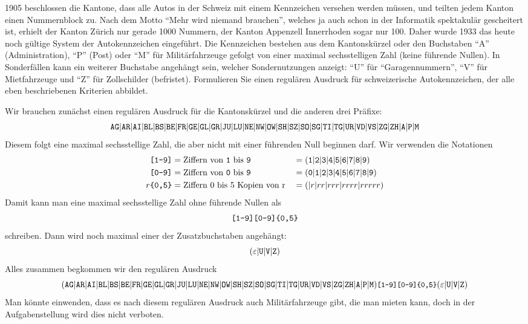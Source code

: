 1905 beschlossen die Kantone, dass alle Autos in der Schweiz mit einem
Kennzeichen versehen werden müssen, und teilten jedem Kanton einen
Nummernblock zu. Nach dem Motto ``Mehr wird niemand brauchen'', welches
ja auch schon in der Informatik spektakulär gescheitert ist, erhielt
der Kanton Zürich nur gerade 1000 Nummern, der
Kanton Appenzell Innerrhoden sogar nur 100.
Daher wurde 1933 das heute noch gültige System der Autokennzeichen
eingeführt. Die Kennzeichen bestehen aus dem Kantonskürzel
oder den Buchstaben ``A'' (Administration), ``P'' (Post) oder
``M'' für Militärfahrzeuge gefolgt von einer maximal sechsstelligen Zahl
(keine führende Nullen).
In Sonderfällen kann ein weiterer Buchstabe angehängt sein, welcher
Sondernutzungen anzeigt: ``U'' für ``Garagennummern'',
``V'' für Mietfahrzeuge und ``Z'' für Zollschilder (befristet).
Formulieren Sie einen regulären Ausdruck für schweizerische Autokennzeichen,
der alle eben beschriebenen Kriterien abbildet.

\begin{loesung}
Wir brauchen zunächst einen regulären Ausdruck für die Kantonskürzel
und die anderen drei Präfixe:
\[
{\tt AG}|
{\tt AR}|
{\tt AI}|
{\tt BL}|
{\tt BS}|
{\tt BE}|
{\tt FR}|
{\tt GE}|
{\tt GL}|
{\tt GR}|
{\tt JU}|
{\tt LU}|
{\tt NE}|
{\tt NW}|
{\tt OW}|
{\tt SH}|
{\tt SZ}|
{\tt SO}|
{\tt SG}|
{\tt TI}|
{\tt TG}|
{\tt UR}|
{\tt VD}|
{\tt VS}|
{\tt ZG}|
{\tt ZH}|
{\tt A}|
{\tt P}|
{\tt M}
\]
Diesem folgt eine maximal sechsstellige Zahl, die aber nicht mit einer
führenden Null beginnen darf. Wir verwenden die Notationen
\begin{align*}
\text{\tt [1-9]}&=\text{Ziffern von {\tt 1} bis {\tt 9}}
&&=
({\tt 1}|
{\tt 2}|
{\tt 3}|
{\tt 4}|
{\tt 5}|
{\tt 6}|
{\tt 7}|
{\tt 8}|
{\tt 9})
\\
\text{\tt [0-9]}&=\text{Ziffern von {\tt 0} bis {\tt 9}}
&&=
({\tt 0}|
{\tt 1}|
{\tt 2}|
{\tt 3}|
{\tt 4}|
{\tt 5}|
{\tt 6}|
{\tt 7}|
{\tt 8}|
{\tt 9})
\\
r{\text{\tt \{0,5\}}}&=\text{Ziffern 0 bis 5 Kopien von r}
&&=(|r|rr|rrr|rrrr|rrrrr)
\end{align*}
Damit kann man eine maximal sechsstellige Zahl ohne führende Nullen als
\[
\text{\tt [1-9][0-9]\{0,5\}}
\]
schreiben.
Dann wird noch maximal einer der Zusatzbuchstaben angehängt:
\[
(\varepsilon|{\tt U}|{\tt V}|{\tt Z})
\]
Alles zusammen begkommen wir den regulären Ausdruck
\[
\small
(
{\tt AG}|
{\tt AR}|
{\tt AI}|
{\tt BL}|
{\tt BS}|
{\tt BE}|
{\tt FR}|
{\tt GE}|
{\tt GL}|
{\tt GR}|
{\tt JU}|
{\tt LU}|
{\tt NE}|
{\tt NW}|
{\tt OW}|
{\tt SH}|
{\tt SZ}|
{\tt SO}|
{\tt SG}|
{\tt TI}|
{\tt TG}|
{\tt UR}|
{\tt VD}|
{\tt VS}|
{\tt ZG}|
{\tt ZH}|
{\tt A}|
{\tt P}|
{\tt M})
\text{\tt [1-9][0-9]\{0,5\}}
(\varepsilon|{\tt U}|{\tt V}|{\tt Z})
\]
Man könnte einwenden, dass es nach diesem regulären Ausdruck auch
Militärfahrzeuge gibt, die man mieten kann, doch in der Aufgabenstellung
wird dies nicht verboten.
\end{loesung}

